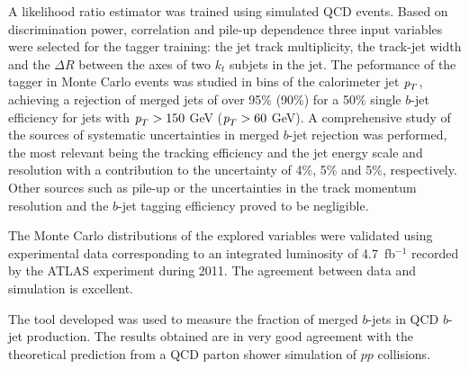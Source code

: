 A likelihood ratio estimator was trained using simulated QCD events.   Based on discrimination power, correlation and pile-up dependence three input variables were selected for the tagger training: the jet track multiplicity, the track-jet width and the $\Delta R$ between the axes of two $k_t$ subjets in the jet. 
 The peformance of the tagger in Monte Carlo events was studied in bins of the calorimeter jet ${\emph{p}_{T}}$, achieving a rejection of merged jets of over 95\% (90\%) for a 50\% single $b$-jet efficiency for jets with ${\emph{p}_{T}}>150$ GeV (${\emph{p}_{T}}>60$ GeV).
A comprehensive study of the sources of systematic uncertainties in merged $b$-jet rejection  %
was performed, the most relevant being the tracking efficiency and the jet energy scale and resolution with %
a contribution to the uncertainty of  4\%, 5\% and 5\%, respectively. 
Other sources such as pile-up or the uncertainties in the track momentum resolution and the $b$-jet tagging efficiency proved to be negligible.


The Monte Carlo distributions of the explored variables were validated using experimental data corresponding to an integrated luminosity of 4.7~fb$^{-1}$ recorded by the ATLAS experiment during 2011. The agreement between data and simulation is excellent.

The tool developed was used to measure the fraction of merged $b$-jets in QCD $b$-jet production. The results obtained are in very good agreement with the theoretical prediction from a QCD parton shower simulation of $pp$ collisions.

